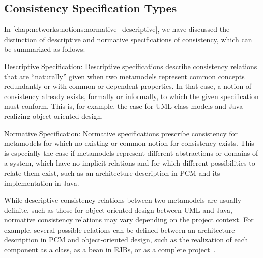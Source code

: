 \subsection{Consistency Specification Types}
\label{chap:improvement:concepts:specification}

In \autoref{chap:networks:notions:normative_descriptive}, we have discussed the distinction of descriptive and normative specifications of consistency, which can be summarized as follows:
\begin{properdescription}
    \item[Descriptive Specification:] Descriptive specifications describe consistency relations that are \enquote{naturally} given when two metamodels represent common concepts redundantly or with common or dependent properties. 
    In that case, a notion of consistency already exists, formally or informally, to which the given specification must conform.
    This is, for example, the case for \gls{UML} class models and Java realizing object-oriented design.
    \item[Normative Specification:] Normative specifications prescribe consistency for metamodels for which no existing or common notion for consistency exists.
    This is especially the case if metamodels represent different abstractions or domains of a system, which have no implicit relations and for which different possibilities to relate them exist, such as an architecture description in \gls{PCM} and its implementation in Java.
\end{properdescription}
While descriptive consistency relations between two metamodels are usually definite, such as those for object-oriented design between \gls{UML} and Java, normative consistency relations may vary depending on the project context.
For example, several possible relations can be defined between an architecture description in \gls{PCM} and object-oriented design, such as the realization of each component as a class, as a bean in \glspl{EJB}, or as a complete project~\cite{langhammer2017a}.


